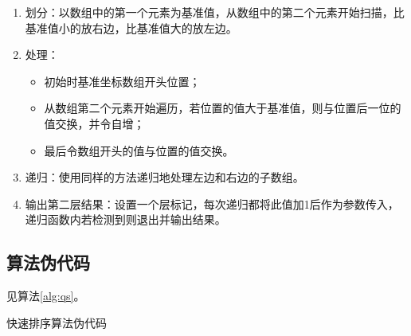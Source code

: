 \begin{enumerate}
    \item 划分：以数组中的第一个元素为基准值，从数组中的第二个元素开始扫描，比基准值小的放右边，比基准值大的放左边。
    \item 处理：
    \begin{itemize}
        \item 初始时基准坐标数组开头位置；
        \item {}从数组第二个元素开始遍历，若位置的值大于基准值，则与位置后一位的值交换，并令自增；
        \item 最后令数组开头的值与位置的值交换。
    \end{itemize}
    \item 递归：使用同样的方法递归地处理左边和右边的子数组。
    \item 输出第二层结果：设置一个层标记，每次递归都将此值加1后作为参数传入，递归函数内若检测到则退出并输出结果。
\end{enumerate}

\subsection{算法伪代码}
见算法\ref{alg:qs}。
\begin{algorithm}[htbp]
\caption{快速排序算法伪代码}\label{alg:qs}
\end{algorithm}